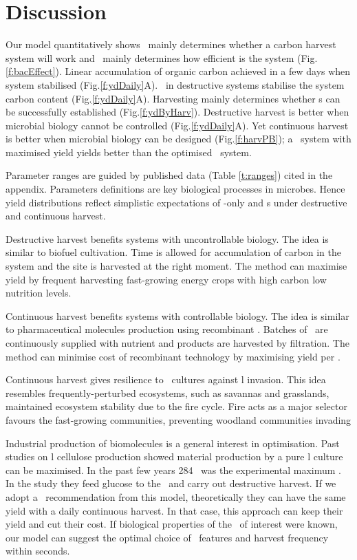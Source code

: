 \documentclass[../thesis.tex]{subfiles} %
\begin{document}
\section{Discussion}
Our model quantitatively shows \bac\ mainly determines whether a carbon harvest system will work and \phy\ mainly determines how efficient is the system (Fig.\ref{f:bacEffect}).  Linear accumulation of organic carbon achieved in a few days when system stabilised (Fig.\ref{f:ydDaily}A).  \Bac\ in destructive systems stabilise the system carbon content (Fig.\ref{f:ydDaily}A).  Harvesting mainly determines whether \pbs s can be successfully established (Fig.\ref{f:ydByHarv}).  Destructive harvest is better when microbial biology cannot be controlled (Fig.\ref{f:ydDaily}A).  Yet continuous harvest is better when microbial biology can be designed (Fig.\ref{f:harvPB}); a \PBH\ system with maximised yield yields better than the optimised \PBN\ system.

Parameter ranges are guided by published data (Table \ref{t:ranges}) cited in the appendix.  Parameters definitions are key biological processes in microbes.  Hence yield distributions reflect simplistic expectations of \phy-only and \pbs s under destructive and continuous harvest.

Destructive harvest benefits systems with uncontrollable biology.  The idea is similar to biofuel cultivation.  Time is allowed for accumulation of carbon in the system and the site is harvested at the right moment.  The method can maximise yield by frequent harvesting fast-growing energy crops with high carbon low nutrition levels.

Continuous harvest benefits systems with controllable biology.  The idea is similar to pharmaceutical molecules production using recombinant \bac.  Batches of \bac\ are continuously supplied with nutrient and products are harvested by filtration.  The method can minimise cost of recombinant technology by maximising yield per \bac.

Continuous harvest gives resilience to \phy\ cultures against \bac l invasion.  This idea resembles frequently-perturbed ecosystems, such as savannas and grasslands, maintained ecosystem stability due to the fire cycle.  Fire acts as a major selector favours the fast-growing communities, preventing woodland communities invading 

Industrial production of biomolecules is a general interest in optimisation.  Past studies on \bac l cellulose production showed material production by a pure \bac l culture can be maximised.  In the past few years 284 \dxdt\ was the experimental maximum \autocite{aytekin2016statistical}.  In the study they feed glucose to the \bac\ and carry out destructive harvest.  If we adopt a \phy\ recommendation from this model, theoretically they can have the same yield with a daily continuous harvest.  In that case, this approach can keep their yield and cut their cost.  If biological properties of the \bac\ of interest were known, our model can suggest the optimal choice of \phy\ features and harvest frequency within seconds.
\end{document}
